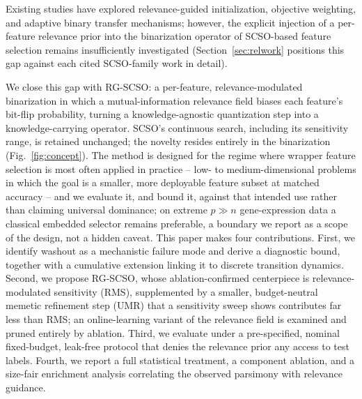 \documentclass[preprint,3p,times]{elsarticle}
\begin{document}
Existing studies have explored relevance-guided initialization, objective
weighting, and adaptive binary transfer mechanisms; however, the explicit
injection of a per-feature relevance prior into the binarization operator of
SCSO-based feature selection remains insufficiently investigated
(Section~\ref{sec:relwork} positions this gap against each cited
SCSO-family work in detail).

We close this gap with RG-SCSO: a per-feature, relevance-modulated
binarization in which a mutual-information relevance field biases each
feature's bit-flip probability, turning a knowledge-agnostic quantization
step into a knowledge-carrying operator. SCSO's continuous search, including
its sensitivity range, is retained unchanged; the novelty resides entirely in
the binarization (Fig.~\ref{fig:concept}). The method is designed for the
regime where wrapper feature selection is most often applied in practice --
low- to medium-dimensional problems in which the goal is a smaller, more
deployable feature subset at matched accuracy -- and we evaluate it, and bound
it, against that intended use rather than claiming universal dominance; on
extreme $p\gg n$ gene-expression data a classical embedded selector remains
preferable, a boundary we report as a scope of the design, not a hidden
caveat. This paper makes four contributions. First, we identify washout as a mechanistic failure mode and
derive a diagnostic bound, together with a cumulative extension linking it to
discrete transition dynamics. Second, we propose RG-SCSO, whose
ablation-confirmed centerpiece is relevance-modulated sensitivity (RMS),
supplemented by a smaller, budget-neutral memetic refinement step (UMR) that a
sensitivity sweep shows contributes far less than RMS; an online-learning
variant of the relevance field is examined and pruned entirely by ablation.
Third, we evaluate under a pre-specified, nominal fixed-budget, leak-free protocol
that denies the relevance prior any access to test labels. Fourth, we report a
full statistical treatment, a component ablation, and a size-fair enrichment
analysis correlating the observed parsimony with relevance guidance.
\end{document}
